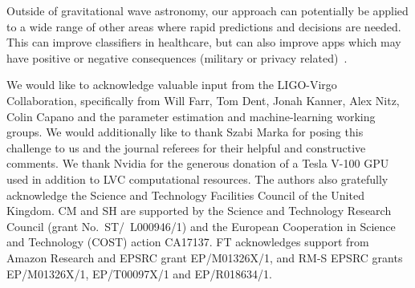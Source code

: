 \documentclass{article}
\begin{document}
Outside of gravitational wave astronomy, our approach can potentially 
be applied to a wide range of other areas where rapid predictions and 
decisions are needed. This can improve classifiers in healthcare, 
but can also improve apps which may have positive or negative 
consequences (military or privacy related)~\cite{1904.06264,NIPS2015_5775,
1512.00570,1612.00005,1807.03653}.

\begin{ack}
%
%
%
We would like to acknowledge valuable input from the LIGO-Virgo Collaboration,
specifically from Will Farr, Tom Dent, Jonah Kanner, Alex Nitz, Colin Capano 
and the parameter estimation 
and machine-learning working groups. We would additionally like to thank Szabi 
Marka for posing this challenge to us and the journal referees for their 
helpful and constructive comments. We thank Nvidia for the generous donation 
of a Tesla V-100 GPU used in addition to \ac{LVC} computational resources. 
The authors also gratefully acknowledge the Science and Technology Facilities 
Council of the United Kingdom. CM and SH are supported by the Science and 
Technology Research Council (grant No.~ST/~L000946/1) and the European 
Cooperation in Science and Technology (COST) action CA17137. FT acknowledges 
support from Amazon Research and  EPSRC grant EP/M01326X/1, and RM-S EPSRC 
grants EP/M01326X/1, EP/T00097X/1 and EP/R018634/1. 
\end{ack}

%

\end{document}
